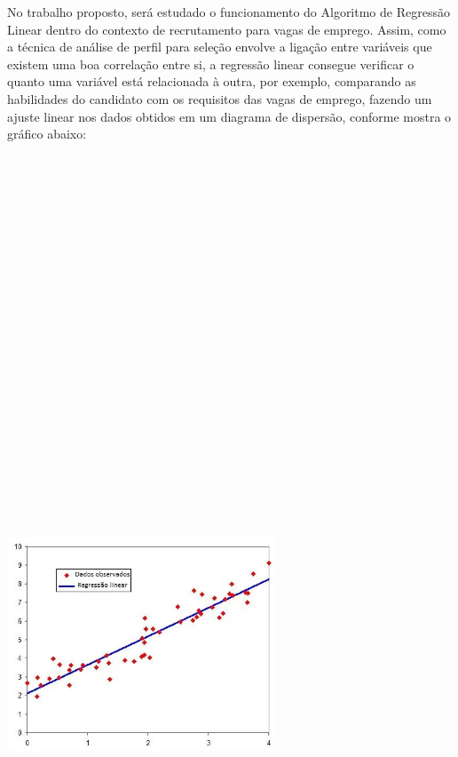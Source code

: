 \documentclass[conference]{IEEEtran}
\begin{document}
No trabalho proposto, será estudado o funcionamento do Algoritmo de Regressão Linear dentro do contexto de recrutamento para vagas de emprego. Assim, como a técnica de análise de perfil para seleção envolve a ligação entre variáveis que existem uma boa correlação entre si, a regressão linear consegue verificar o quanto uma variável está relacionada à outra, por exemplo, comparando as habilidades do candidato com os requisitos das vagas de emprego, fazendo um ajuste linear nos dados obtidos em um diagrama de dispersão, conforme mostra o gráfico abaixo:


\vspace{7mm}
\centerline{\includegraphics[width=80mm,height=600mm,keepaspectratio]{ExRegressaoLinear.png}}
\vspace{7mm}
\end{document}
